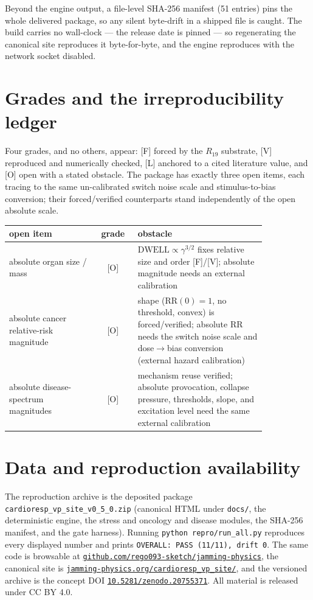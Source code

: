 \documentclass[11pt]{article}
\newcommand{\grade}[1]{\textsf{\small[#1]}}
\newcommand{\doi}{10.5281/zenodo.20755371}
\begin{document}
\noindent
Beyond the engine output, a file-level SHA-256 manifest (51 entries) pins the whole delivered package,
so any silent byte-drift in a shipped file is caught. The build carries no wall-clock --- the release
date is pinned --- so regenerating the canonical site reproduces it byte-for-byte, and the engine
reproduces with the network socket disabled.

\section{Grades and the irreproducibility ledger}\label{sec:ledger}

Four grades, and no others, appear: \grade{F} forced by the $R_{19}$ substrate, \grade{V} reproduced
and numerically checked, \grade{L} anchored to a cited literature value, and \grade{O} open with a
stated obstacle. The package has exactly three open items, each tracing to the same un-calibrated switch
noise scale and stimulus-to-bias conversion; their forced/verified counterparts stand independently of
the open absolute scale.

\begin{center}
\begin{tabular}{@{}p{0.34\linewidth}cp{0.50\linewidth}@{}}
\toprule
open item & grade & obstacle\\
\midrule
absolute organ size / mass & \grade{O} & $\text{DWELL}\propto\gamma^{3/2}$ fixes relative size and order \grade{F}/\grade{V}; absolute magnitude needs an external calibration\\
absolute cancer relative-risk magnitude & \grade{O} & shape ($\mathrm{RR}(0)=1$, no threshold, convex) is forced/verified; absolute RR needs the switch noise scale and dose$\to$bias conversion (external hazard calibration)\\
absolute disease-spectrum magnitudes & \grade{O} & mechanism reuse verified; absolute provocation, collapse pressure, thresholds, slope, and excitation level need the same external calibration\\
\bottomrule
\end{tabular}
\end{center}

\section{Data and reproduction availability}

The reproduction archive is the deposited package \texttt{cardioresp\_vp\_site\_v0\_5\_0.zip} (canonical
HTML under \texttt{docs/}, the deterministic engine, the stress and oncology and disease modules, the
SHA-256 manifest, and the gate harness). Running \texttt{python repro/run\_all.py} reproduces every
displayed number and prints \texttt{OVERALL: PASS (11/11), drift 0}. The same code is browsable at
\href{https://github.com/rego093-sketch/jamming-physics}{\texttt{github.com/rego093-sketch/jamming-physics}},
the canonical site is \href{https://jamming-physics.org/cardioresp_vp_site/}{\texttt{jamming-physics.org/cardioresp\_vp\_site/}},
and the versioned archive is the concept DOI \href{https://doi.org/10.5281/zenodo.20755371}{\texttt{\doi}}.
All material is released under CC BY 4.0.
\end{document}
